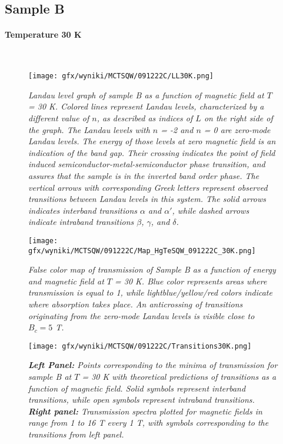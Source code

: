 \documentclass[titlepage,a4paper]{book}
\newcommand{\wciecie}{\quad\phantom{v}}
\newcommand{\myparagraph}[1]{\paragraph{#1}\mbox{}\\}
\begin{document}
\subsection{Sample B}
\myparagraph{Temperature 30 K}
\wciecie
\begin{figure}[H]
	\centering
	\texttt{[image: gfx/wyniki/MCTSQW/091222C/LL30K.png]}
	\vspace{-10pt}
	\caption{\textit{Landau level graph of sample B as a function of magnetic field at $T$ = 30 K. Colored lines represent Landau levels, characterized by a different value of $n$, as described as indices of $L$ on the right side of the graph. The Landau levels with $n$ = -2 and $n$ = 0 are zero-mode Landau levels. The energy of those levels at zero magnetic field is an indication of the band gap. Their crossing indicates the point of field induced semiconductor-metal-semiconductor phase transition, and assures that the sample is in the inverted band order phase. The vertical arrows with corresponding Greek letters represent observed transitions between Landau levels in this system. The solid arrows indicates interband transitions $\alpha$ and $\alpha'$, while dashed arrows indicate intraband transitions $\beta$, $\gamma$, and $\delta$.}}
	\label{fig:LL_SQW_30K}
\end{figure}

\begin{figure}[H]
	\centering
	\texttt{[image: gfx/wyniki/MCTSQW/091222C/Map\_HgTeSQW\_091222C\_30K.png]}
	\vspace{-10pt}
	\caption{\textit{False color map of transmission of Sample B as a function of energy and magnetic field at $T$ = 30 K. Blue color represents areas where transmission is equal to 1, while lightblue/yellow/red colors indicate where absorption takes place. An anticrossing of transitions originating from the zero-mode Landau levels is visible close to $B_c = 5$ T. }}
	\label{fig:Map_SQW_30K}
\end{figure}

\begin{figure}[ht]
	\centering
	\texttt{[image: gfx/wyniki/MCTSQW/091222C/Transitions30K.png]}
	\vspace{-10pt}
	\caption{\textit{\textbf{Left Panel:} Points corresponding to the minima of transmission for sample B at $T$ = 30 K with theoretical predictions of transitions as a function of magnetic field. Solid symbols represent interband transitions, while open symbols represent intraband transitions. \textbf{Right panel:} Transmission spectra plotted for magnetic fields in range from 1 to 16 T every 1 T, with symbols corresponding to the transitions from left panel.}}
	\label{fig:Summary_SQW_30K}
\end{figure}
\end{document}
